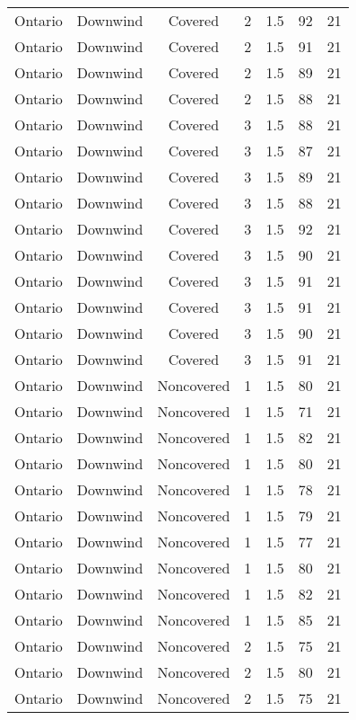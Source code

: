 \documentclass{article}
\begin{document}
\begin{longtable}[H]{ccccccc}
Ontario & Downwind & Covered     & 2 & 1.5  & 92  & 21 \\
Ontario & Downwind & Covered     & 2 & 1.5  & 91  & 21 \\
Ontario & Downwind & Covered     & 2 & 1.5  & 89  & 21 \\
Ontario & Downwind & Covered     & 2 & 1.5  & 88  & 21 \\
Ontario & Downwind & Covered     & 3 & 1.5  & 88  & 21 \\
Ontario & Downwind & Covered     & 3 & 1.5  & 87  & 21 \\
Ontario & Downwind & Covered     & 3 & 1.5  & 89  & 21 \\
Ontario & Downwind & Covered     & 3 & 1.5  & 88  & 21 \\
Ontario & Downwind & Covered     & 3 & 1.5  & 92  & 21 \\
Ontario & Downwind & Covered     & 3 & 1.5  & 90  & 21 \\
Ontario & Downwind & Covered     & 3 & 1.5  & 91  & 21 \\
Ontario & Downwind & Covered     & 3 & 1.5  & 91  & 21 \\
Ontario & Downwind & Covered     & 3 & 1.5  & 90  & 21 \\
Ontario & Downwind & Covered     & 3 & 1.5  & 91  & 21 \\
Ontario & Downwind & Noncovered & 1 & 1.5  & 80  & 21 \\
Ontario & Downwind & Noncovered & 1 & 1.5  & 71  & 21 \\
Ontario & Downwind & Noncovered & 1 & 1.5  & 82  & 21 \\
Ontario & Downwind & Noncovered & 1 & 1.5  & 80  & 21 \\
Ontario & Downwind & Noncovered & 1 & 1.5  & 78  & 21 \\
Ontario & Downwind & Noncovered & 1 & 1.5  & 79  & 21 \\
Ontario & Downwind & Noncovered & 1 & 1.5  & 77  & 21 \\
Ontario & Downwind & Noncovered & 1 & 1.5  & 80  & 21 \\
Ontario & Downwind & Noncovered & 1 & 1.5  & 82  & 21 \\
Ontario & Downwind & Noncovered & 1 & 1.5  & 85  & 21 \\
Ontario & Downwind & Noncovered & 2 & 1.5  & 75  & 21 \\
Ontario & Downwind & Noncovered & 2 & 1.5  & 80  & 21 \\
Ontario & Downwind & Noncovered & 2 & 1.5  & 75  & 21 \\

\end{longtable}
\end{document}
